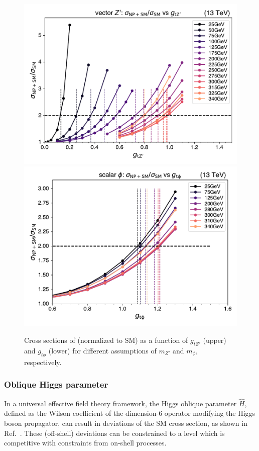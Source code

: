 \begin{figure}[!htbp]
    \centering
    \includegraphics[width=0.78\linewidth]{figs/ftan/plot_xsec_zprime.pdf} \\
    \includegraphics[width=0.78\linewidth]{figs/ftan/plot_xsec_phi.pdf}
    \caption{
        Cross sections of \tttt (normalized to SM) as a function of $g_{tZ'}$ (upper)
        and $g_{t\phi}$ (lower) for different assumptions of $m_{Z'}$ and $m_{\phi}$,
        respectively.
    }
    \label{fig:cross_section_zprimephi}
\end{figure}

\FloatBarrier

\subsubsection{Oblique Higgs parameter}
\label{sec:fthhat}

In a universal effective field theory framework, the Higgs oblique
parameter $\hat H$, defined as the Wilson coefficient of the dimension-6
operator modifying the Higgs boson propagator, can result in deviations of the
SM \tttt cross section, as shown in Ref.~\cite{THEORY:ObliqueHiggs2019}.  These
(off-shell) deviations can be constrained to a level which is competitive with
constraints from on-shell processes.

